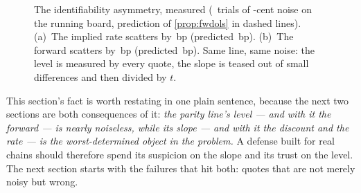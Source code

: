 \begin{figure}[htbp]
\centering
{}
\caption{The identifiability asymmetry, measured
(\MacFwdIdentTrials\ trials of \MacFwdIdentEpsCents-cent noise on the
running board, prediction of \cref{prop:fwdols} in dashed lines).
(a)~The implied rate scatters by \MacFwdIdentRateSdBp\,bp (predicted
\MacFwdIdentRatePredBp\,bp).  (b)~The forward scatters by
\MacFwdIdentFwdSdBp\,bp (predicted \MacFwdIdentFwdPredBp\,bp).  Same
line, same noise: the level is measured by every quote, the slope is
teased out of small differences and then divided by $t$.}
\label{fig:fwdident}
\end{figure}

This section's fact is worth restating in one plain sentence, because
the next two sections are both consequences of it: \emph{the parity
line's level --- and with it the forward --- is nearly noiseless,
while its slope --- and with it the discount and the rate --- is the
worst-determined object in the problem.}  A defense built for real
chains should therefore spend its suspicion on the slope and its
trust on the level.  The next section starts with the failures that
hit both: quotes that are not merely noisy but wrong.
